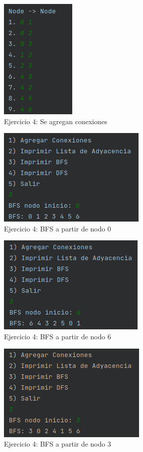 \documentclass{article}
\begin{document}
			\begin{figure}[H]
				\centering
				\includegraphics[scale= 0.9]{images/e42.png}
				\caption*{Ejercicio 4: Se agregan conexiones}
			\end{figure}
			
			\begin{figure}[H]
				\centering
				\includegraphics[scale= 1]{images/e43.png}
				\caption*{Ejercicio 4: BFS a partir de nodo 0}
			\end{figure}
			
			\begin{figure}[H]
				\centering
				\includegraphics[scale= 1]{images/e44.png}
				\caption*{Ejercicio 4: BFS a partir de nodo 6}
			\end{figure}
			
			\begin{figure}[H]
				\centering
				\includegraphics[scale= 1]{images/e45.png}
				\caption*{Ejercicio 4: BFS a partir de nodo 3}
			\end{figure}
			
\end{document}
